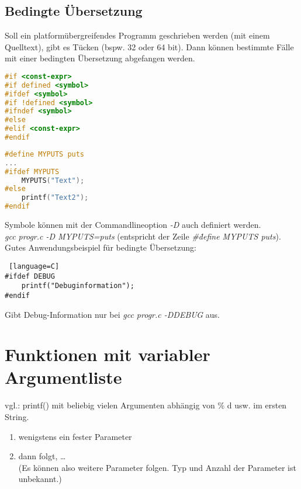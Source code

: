 \subsection{Bedingte Übersetzung}

Soll ein platformübergreifendes Programm geschrieben werden (mit einem Quelltext), gibt es Tücken (bspw. 32 oder 64 bit). Dann können bestimmte Fälle mit einer bedingten Übersetzung abgefangen werden.
\begin{lstlisting}[language=C]
#if <const-expr>
#if defined <symbol>
#ifdef <symbol>
#if !defined <symbol>
#ifndef <symbol>
#else 
#elif <const-expr>
#endif
\end{lstlisting}

\begin{lstlisting}[language=C]
#define MYPUTS puts
...
#ifdef MYPUTS
	MYPUTS("Text");
#else
	printf("Text2");
#endif
\end{lstlisting}
Symbole können mit der Commandlineoption \emph{-D} auch definiert werden.\\
\emph{gcc progr.c -D MYPUTS=puts} (entspricht der Zeile \emph{\#\. define MYPUTS puts}). \medskip\\
Gutes Anwendungsbeispiel für bedingte Übersetzung:
\begin{lstlisting} [language=C]
#ifdef DEBUG
	printf("Debuginformation");
#endif
\end{lstlisting}
Gibt Debug-Information nur bei \emph{gcc progr.c -DDEBUG} aus.

\section{Funktionen mit variabler Argumentliste}

vgl.: printf() mit beliebig vielen Argumenten abhängig von \% d usw. im ersten String.
\begin{enumerate}
\item wenigstens ein fester Parameter
\item dann folgt, … \\
(Es können also weitere Parameter folgen. Typ und Anzahl der Parameter ist unbekannt.)
\end{enumerate}

